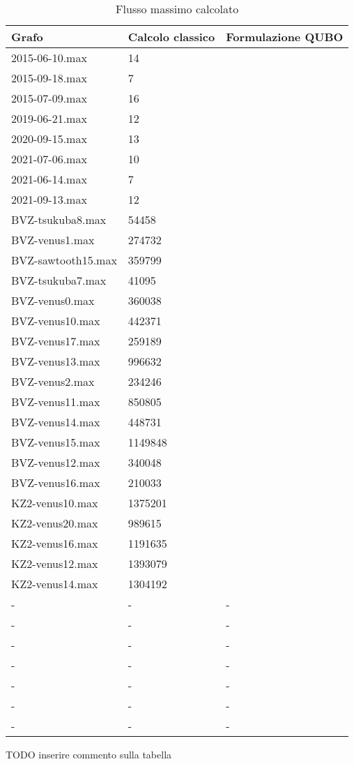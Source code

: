 \documentclass{article}
\begin{document}
\begin{table}
    \caption{Flusso massimo calcolato}\label{tabella_valori}
    \centering
    \begin{tabular}{|l|l|l|}
    \hline
        Grafo & Calcolo classico & Formulazione QUBO \\ \hline
        2015-06-10.max & 14 & \\ \hline
        2015-09-18.max & 7 & \\ \hline
        2015-07-09.max & 16 & \\ \hline
        2019-06-21.max & 12 & \\ \hline
        2020-09-15.max & 13 & \\ \hline
        2021-07-06.max & 10 & \\ \hline
        2021-06-14.max & 7 & \\ \hline
        2021-09-13.max & 12 & \\ \hline
        BVZ-tsukuba8.max & 54458 & \\ \hline
        BVZ-venus1.max & 274732 & \\ \hline
        BVZ-sawtooth15.max & 359799 & \\ \hline
        BVZ-tsukuba7.max & 41095 & \\ \hline
        BVZ-venus0.max & 360038 & \\ \hline
        BVZ-venus10.max & 442371 & \\ \hline
        BVZ-venus17.max & 259189 & \\ \hline
        BVZ-venus13.max & 996632 & \\ \hline
        BVZ-venus2.max & 234246 & \\ \hline
        BVZ-venus11.max & 850805 & \\ \hline
        BVZ-venus14.max & 448731 & \\ \hline
        BVZ-venus15.max & 1149848 & \\ \hline
        BVZ-venus12.max & 340048 & \\ \hline
        BVZ-venus16.max & 210033 & \\ \hline
        KZ2-venus10.max & 1375201 & \\ \hline
        KZ2-venus20.max & 989615 & \\ \hline
        KZ2-venus16.max & 1191635 & \\ \hline
        KZ2-venus12.max & 1393079 & \\ \hline
        KZ2-venus14.max & 1304192 & \\ \hline
        - & - & - \\ \hline
        - & - & - \\ \hline
        - & - & - \\ \hline
        - & - & - \\ \hline
        - & - & - \\ \hline
        - & - & - \\ \hline
        - & - & - \\ \hline
    \end{tabular}
\end{table}

\pagebreak

TODO inserire commento sulla tabella

\pagebreak


\end{document}
